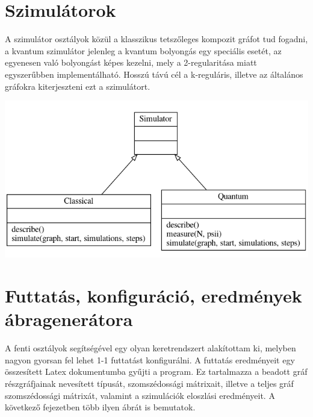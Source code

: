 \section{Szimulátorok}

A szimulátor osztályok közül a klasszikus tetszőleges kompozit gráfot tud fogadni,
a kvantum szimulátor jelenleg a kvantum bolyongás egy speciális esetét, az egyenesen
való bolyongást képes kezelni, mely a 2-regularitása miatt egyszerűbben implementálható.
Hosszú távú cél a k-reguláris, illetve az általános gráfokra kiterjeszteni ezt a szimulátort.

\begin{center}
  \includegraphics[width=0.8\linewidth]{./figures/simulator.png}
\end{center}

\section{Futtatás, konfiguráció, eredmények ábragenerátora}

A fenti osztályok segítségével egy olyan keretrendszert alakítottam ki, melyben
nagyon gyorsan fel lehet 1-1 futtatást konfigurálni. A futtatás eredményeit egy
összesített Latex dokumentumba gyűjti a program. Ez tartalmazza a beadott
gráf részgráfjainak nevesített típusát, szomszédossági mátrixait, illetve a
teljes gráf szomszédossági mátrixát, valamint a szimulációk eloszlási eredményeit.
A következő fejezetben több ilyen ábrát is bemutatok.

